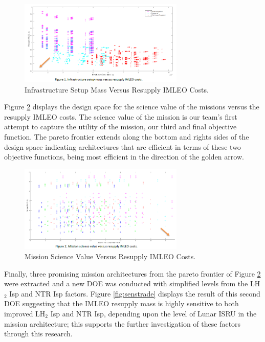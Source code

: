 \documentclass[]{aiaa-pretty}
\begin{document}
\begin{figure}[h!]
	\centering
	\includegraphics[width=0.7\textwidth]{InfraTrade}  %
	\caption{Infrastructure Setup Mass Versus Resupply IMLEO Costs.}
	\label{fig:infratrade}
\end{figure}

Figure \ref{fig:fulltrade} displays the design space for the science value of the missions versus the resupply IMLEO costs. The science value of the mission is our team’s first attempt to capture the utility of the mission, our third and final objective function. The pareto frontier extends along the bottom and rights sides of the design space indicating architectures that are efficient in terms of these two objective functions, being most efficient in the direction of the golden arrow.

\begin{figure}[h!]
	\centering
	\includegraphics[width=0.7\textwidth]{fulltrade}
	\caption{Mission Science Value Versus Resupply IMLEO Costs.}
	\label{fig:fulltrade}
\end{figure}

Finally, three promising mission architectures from the pareto frontier of Figure \ref{fig:fulltrade} were extracted and a new DOE was conducted with simplified levels from the  LH$_2$ Isp and NTR Isp factors. Figure \ref{fig:senstrade} displays the result of this second DOE suggesting that the IMLEO resupply mass is highly sensitive to both improved  LH$_2$ Isp and NTR Isp, depending upon the level of Lunar ISRU in the mission architecture; this supports the further investigation of these factors through this research.
\end{document}

